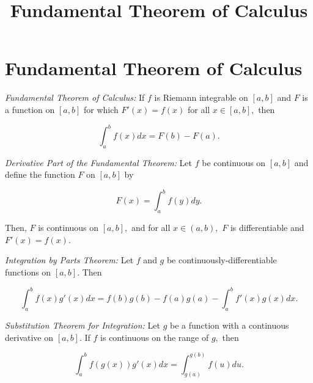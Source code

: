 \documentclass{article}
\title{Fundamental Theorem of Calculus}
\begin{document}
\section{Fundamental Theorem of Calculus}

\emph{Fundamental Theorem of Calculus:} If $f$ is Riemann integrable on $[a,b]$ and $F$ is a function on $[a,b]$ for which $F'(x) = f(x)$ for all $x \in [a,b],$ then

\[ \int_{a}^{b} f(x) dx = F(b) - F(a). \]

\emph{Derivative Part of the Fundamental Theorem:} Let $f$ be \@{continuous} on $[a,b]$ and define the function $F$ on $[a,b]$ by

\[ F(x) = \int_{a}^{b} f(y) dy. \]

Then, $F$ is continuous on $[a,b],$ and for all $x \in (a,b),$ $F$ is \@{differentiable} and $F'(x) = f(x).$

\emph{Integration by Parts Theorem:}  Let $f$ and $g$ be \@{continuously-differentiable} functions on $[a,b].$ Then

\[ \int_{a}^{b} f(x)g'(x)dx = f(b)g(b) - f(a)g(a) - \int_{a}^{b} f'(x)g(x)dx. \]

\emph{Substitution Theorem for Integration:} Let $g$ be a function with a continuous derivative on $[a,b].$ If $f$ is \@{continuous} on the \@{range} of $g,$ then

\[ \int_{a}^{b}f(g(x))g'(x)dx = \int_{g(a)}^{g(b)} f(u)du. \]
\end{document}

